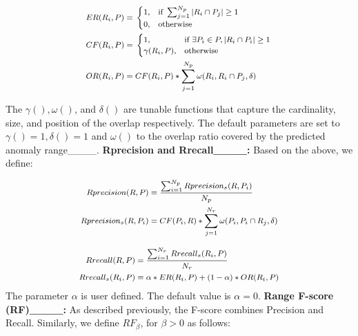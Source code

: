 \begin{equation}
\footnotesize{
\begin{split}
&ER(R_i,P) = \left.
\begin{cases}
1, &\text{if } \sum_{j=1}^{N_p} |R_i \cap P_j| \geq 1\\
0, &\text{otherwise}
\end{cases}
\right. \\
&CF(R_i,P) = \left.
\begin{cases}
1, &\text{if } \exists P_i \in P, |R_i \cap P_i| \geq 1\\
\gamma(R_i,P), &\text{otherwise}
\end{cases}
\right. \\
&OR(R_i,P) = CF(R_i,P)*\sum_{j=1}^{N_p} \omega(R_i,R_i \cap P_j, \delta)
\end{split}
}
\end{equation}

\noindent The $\gamma(),\omega()$, and $\delta()$ are tunable functions that capture the cardinality, size, and position of the overlap respectively.
The default parameters are set to $\gamma()=1,\delta()=1$ and $\omega()$ to the overlap ratio covered by the predicted anomaly range____.
\newline \textbf{Rprecision and Rrecall____: } Based on the above, we define:

\begin{equation}
\footnotesize{
\begin{split}
Rprecision(R,P) &= \frac{\sum_{i=1}^{N_p} Rprecision_s(R,P_i)}{N_p}\\
Rprecision_s(R,P_i) &= CF(P_i,R)*\sum_{j=1}^{N_r} \omega(P_i,P_i \cap R_j, \delta)
\end{split}
}
\end{equation}

\begin{equation}
\footnotesize{
\begin{split}
Rrecall(R,P) &= \frac{\sum_{i=1}^{N_r} Rrecall_s(R_i,P)}{N_r} \\
Rrecall_s(R_i,P) &= \alpha*ER(R_i,P) + (1-\alpha)*OR(R_i,P)
\end{split}
}
\end{equation}
\noindent The parameter $\alpha$ is user defined. The default value is $\alpha=0$.
\newline \textbf{Range F-score (RF)____: } As described previously, the F-score combines Precision and Recall. Similarly, we define $RF_{\beta}$, for $\beta>0$ as follows:

